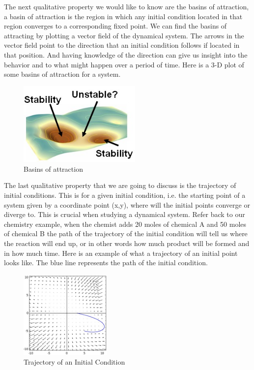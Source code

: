 \documentclass{article}
\begin{document}
The next qualitative property we would like to know are the basins of attraction, a basin of attraction is the region in which any initial condition located in that region converges to a corresponding fixed point. We can find the basins of attracting by plotting a vector field of the dynamical system. The arrows in the vector field point to the direction that an initial condition follows if located in that position. And having knowledge of the direction can give us insight into the behavior and to what might happen over a period of time. Here is a 3-D plot of some basins of attraction for a system.

\begin{figure}[ht!]
\centering
\includegraphics[width=60mm]{boa.jpg}
\caption{Basins of attraction}
\label{overflow}
\end{figure}
The last qualitative property that we are going to discuss is the trajectory of initial conditions. This is for a given initial condition, i.e. the starting point of a system given by a coordinate point (x,y), where will the initial points converge or diverge to. This is crucial when studying a dynamical system. Refer back to our chemistry example, when the chemist adds 20 moles of chemical A and 50 moles of chemical B the path of the trajectory of the initial condition will tell us where the reaction will end up, or in other words how much product will be formed and in how much time. Here is an example of what a trajectory of an initial point looks like. The blue line represents the path of the initial condition.
\begin{figure}[ht!]
\centering
\includegraphics[width=45mm]{traj.jpg}
\caption{Trajectory of an Initial Condition}
\label{overflow}
\end{figure}
\newpage
\end{document}
